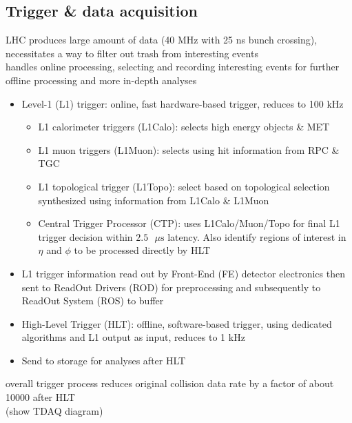 \documentclass[../thesis.tex]{subfiles}
\begin{document}
\subsection{Trigger \& data acquisition}
LHC produces large amount of data (40 MHz with 25 ns bunch crossing), necessitates a way to filter out trash from interesting events\\
handles online processing, selecting and recording interesting events for further offline processing and more in-depth analyses\\
\begin{itemize}
\item Level-1 (L1) trigger: online, fast hardware-based trigger, reduces to 100 kHz
\begin{itemize}
\item L1 calorimeter triggers (L1Calo): selects high energy objects \& MET
\item L1 muon triggers (L1Muon): selects using hit information from RPC \& TGC
\item L1 topological trigger (L1Topo): select based on topological selection synthesized using information from L1Calo \& L1Muon
\item Central Trigger Processor (CTP): uses L1Calo/Muon/Topo for final L1 trigger decision within $2.5 \text{ $\mu$s}$ latency. Also identify regions of interest in $\eta$ and $\phi$ to be processed directly by HLT
\end{itemize}
\item L1 trigger information read out by Front-End (FE) detector electronics then sent to ReadOut Drivers (ROD) for preprocessing and subsequently to ReadOut System (ROS) to buffer
\item High-Level Trigger (HLT): offline, software-based trigger, using dedicated algorithms and L1 output as input, reduces to 1 kHz
\item Send to storage for analyses after HLT
\end{itemize}
overall trigger process reduces original collision data rate by a factor of about 10000 after HLT\\
(show TDAQ diagram)
\end{document}
